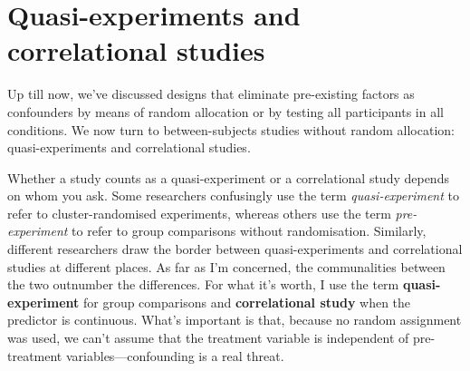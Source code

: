 \documentclass[a4paper]{tufte-book}\usepackage[]{graphicx}\usepackage[]{xcolor}
\newcommand{\term}[1]{\textbf{#1}}
\newcommand*{\parend}[1][$\diamondsuit$]{%
\leavevmode\unskip\penalty9999 \hbox{}\nobreak\hfill
    \quad\hbox{#1}%
}
\begin{document}
%           



\chapter{Quasi-experiments and correlational studies}\label{ch:quasi}

Up till now, we've discussed designs that eliminate pre-existing
factors as confounders by means of random allocation or by testing all participants
in all conditions.
We now turn to between-subjects studies without random allocation:
quasi-experiments and correlational studies.

Whether a study counts as a quasi-experiment or a 
correlational study depends on whom you ask.
Some researchers confusingly use the term \textit{quasi-experiment}
to refer to cluster-randomised experiments, whereas others
use the term \textit{pre-experiment} to refer to group comparisons
without randomisation. Similarly, different researchers draw the
border between quasi-experiments and correlational studies at different places.
As far as I'm concerned, the communalities between the two 
outnumber the differences.
For what it's worth, I use the term \term{quasi-experiment} for group comparisons 
and \term{correlational study} when the predictor is continuous.
What's important is that, because no random assignment was used,
we can't assume that the treatment variable is independent of
pre-treatment variables---confounding is a real threat.
\end{document}
